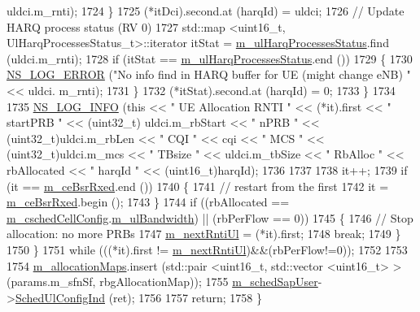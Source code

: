 \begin{DoxyCode}
      uldci.m\_rnti);
1724             \}
1725           (*itDci).second.at (harqId) = uldci;
1726           \textcolor{comment}{// Update HARQ process status (RV 0)}
1727           std::map <uint16\_t, UlHarqProcessesStatus\_t>::iterator itStat = 
      \hyperlink{classns3_1_1FdMtFfMacScheduler_a22401d77ac7acda9217ac4807fd55fa2}{m\_ulHarqProcessesStatus}.find (uldci.m\_rnti);
1728           \textcolor{keywordflow}{if} (itStat == \hyperlink{classns3_1_1FdMtFfMacScheduler_a22401d77ac7acda9217ac4807fd55fa2}{m\_ulHarqProcessesStatus}.end ())
1729             \{
1730               \hyperlink{group__logging_ga0261a8db1d4ac5f79417d117634fd455}{NS\_LOG\_ERROR} (\textcolor{stringliteral}{"No info find in HARQ buffer for UE (might change eNB) "} << uldci.
      m\_rnti);
1731             \}
1732           (*itStat).second.at (harqId) = 0;
1733         \}
1734 
1735       \hyperlink{group__logging_gafbd73ee2cf9f26b319f49086d8e860fb}{NS\_LOG\_INFO} (\textcolor{keyword}{this} << \textcolor{stringliteral}{" UE Allocation RNTI "} << (*it).first << \textcolor{stringliteral}{" startPRB "} << (uint32\_t)
      uldci.m\_rbStart << \textcolor{stringliteral}{" nPRB "} << (uint32\_t)uldci.m\_rbLen << \textcolor{stringliteral}{" CQI "} << cqi << \textcolor{stringliteral}{" MCS "} << (uint32\_t)uldci.m\_mcs 
      << \textcolor{stringliteral}{" TBsize "} << uldci.m\_tbSize << \textcolor{stringliteral}{" RbAlloc "} << rbAllocated << \textcolor{stringliteral}{" harqId "} << (uint16\_t)harqId);
1736 
1737 
1738       it++;
1739       \textcolor{keywordflow}{if} (it == \hyperlink{classns3_1_1FdMtFfMacScheduler_a10a21cad9af4c783734123f38e697316}{m\_ceBsrRxed}.end ())
1740         \{
1741           \textcolor{comment}{// restart from the first}
1742           it = \hyperlink{classns3_1_1FdMtFfMacScheduler_a10a21cad9af4c783734123f38e697316}{m\_ceBsrRxed}.begin ();
1743         \}
1744       \textcolor{keywordflow}{if} ((rbAllocated == \hyperlink{classns3_1_1FdMtFfMacScheduler_a9f2e3c6bfae8bfc266a84f64e5937ac8}{m\_cschedCellConfig}.\hyperlink{structns3_1_1FfMacCschedSapProvider_1_1CschedCellConfigReqParameters_a5ab5b102878e6e7e7727a14af4a64d2f}{m\_ulBandwidth}) || (rbPerFlow ==
       0))
1745         \{
1746           \textcolor{comment}{// Stop allocation: no more PRBs}
1747           \hyperlink{classns3_1_1FdMtFfMacScheduler_ae8ab0aba539cbc8f37e1f593353063e0}{m\_nextRntiUl} = (*it).first;
1748           \textcolor{keywordflow}{break};
1749         \}
1750     \}
1751   \textcolor{keywordflow}{while} (((*it).first != \hyperlink{classns3_1_1FdMtFfMacScheduler_ae8ab0aba539cbc8f37e1f593353063e0}{m\_nextRntiUl})&&(rbPerFlow!=0));
1752 
1753 
1754   \hyperlink{classns3_1_1FdMtFfMacScheduler_a95332c7dd2b82f65f37ee9bff70558e6}{m\_allocationMaps}.insert (std::pair <uint16\_t, std::vector <uint16\_t> > (params.m\_sfnSf, 
      rbgAllocationMap));
1755   \hyperlink{classns3_1_1FdMtFfMacScheduler_ac856cbc41e5ac4e78562686fd29ba873}{m\_schedSapUser}->\hyperlink{classns3_1_1FfMacSchedSapUser_a1b89636256701a84d990db7db8aea874}{SchedUlConfigInd} (ret);
1756 
1757   \textcolor{keywordflow}{return};
1758 \}
\end{DoxyCode}


